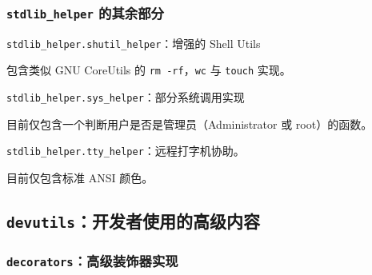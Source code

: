 \documentclass[pdf,9pt]{beamer}
\begin{document}
    \subsubsection{\texttt{stdlib\_helper} 的其余部分}

    \begin{frame}[fragile]{\subsubsecname}
        \texttt{stdlib\_helper.shutil\_helper}：增强的 Shell Utils

        \hspace*{2em} 包含类似 GNU CoreUtils 的 \Verb|rm -rf|，\Verb|wc| 与 \Verb|touch| 实现。

        \texttt{stdlib\_helper.sys\_helper}：部分系统调用实现

        \hspace*{2em} 目前仅包含一个判断用户是否是管理员（Administrator 或 root）的函数。

        \texttt{stdlib\_helper.tty\_helper}：远程打字机协助。

        \hspace*{2em} 目前仅包含标准 ANSI 颜色。
    \end{frame}

    \subsection{\texttt{devutils}：开发者使用的高级内容}

    \begin{frame}
        \subsectionpage
    \end{frame}

    \subsubsection{\texttt{decorators}：高级装饰器实现}
\end{document}

